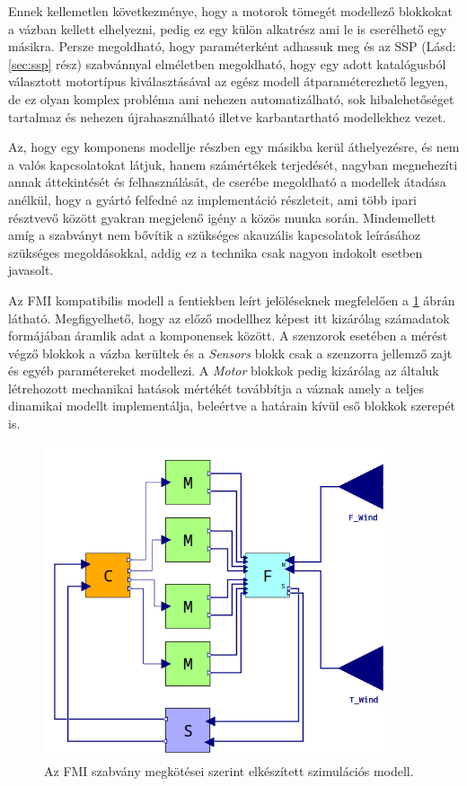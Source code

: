        Ennek kellemetlen következménye, hogy a motorok tömegét modellező blokkokat a vázban kellett elhelyezni, pedig ez egy külön alkatrész ami le is cserélhető egy másikra.
        Persze megoldható, hogy paraméterként adhassuk meg és az SSP (Lásd: \ref{sec:ssp} rész) szabvánnyal elméletben megoldható, hogy egy adott katalógusból választott motortípus kiválasztásával az egész modell átparaméterezhető legyen, de ez olyan komplex probléma ami nehezen automatizálható, sok hibalehetőséget tartalmaz és nehezen újrahasználható illetve karbantartható modellekhez vezet.

        Az, hogy egy komponens modellje részben egy másikba kerül áthelyezésre, és nem a valós kapcsolatokat látjuk, hanem számértékek terjedését, nagyban megnehezíti annak áttekintését és felhasználását, de cserébe megoldható a modellek átadása anélkül, hogy a gyártó felfedné az implementáció részleteit, ami több ipari résztvevő között gyakran megjelenő igény a közös munka során.
        Mindemellett amíg a szabványt nem bővítik a szükséges akauzális kapcsolatok leírásához szükséges megoldásokkal, addig ez a technika csak nagyon indokolt esetben javasolt.

        Az FMI kompatibilis modell a fentiekben leírt jelöléseknek megfelelően a \ref{fig:fmiSzim} ábrán látható.
        Megfigyelhető, hogy az előző modellhez képest itt kizárólag számadatok formájában áramlik adat a komponensek között.
        A szenzorok esetében a mérést végző blokkok a vázba kerültek és a \emph{Sensors} blokk csak a szenzorra jellemző zajt és egyéb paramétereket modellezi.
        A \emph{Motor} blokkok pedig kizárólag az általuk létrehozott mechanikai hatások mértékét továbbítja a váznak amely a teljes dinamikai modellt implementálja, beleértve a határain kívül eső blokkok szerepét is.

        \begin{figure}[!ht]
            \centering
            \includegraphics[width=100mm, keepaspectratio]{figures/fmiSzim.png}
            \caption{Az FMI szabvány megkötései szerint elkészített szimulációs modell.} 
            \label{fig:fmiSzim}
        \end{figure}

